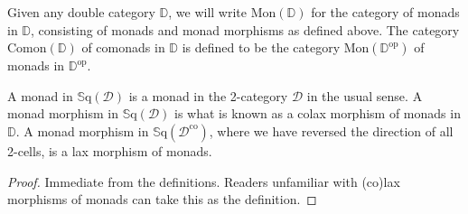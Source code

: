 \begin{definition}
	Given any double category $\mathbb{D}$, we will write $\mathrm{Mon}(\mathbb{D})$ for the category of monads in $\mathbb{D}$, consisting of monads and monad morphisms as defined above. The category $\mathrm{Comon}(\mathbb{D})$ of comonads in $\mathbb{D}$ is defined to be the category $\mathrm{Mon}(\mathbb{D}^{\text{op}})$ of monads in $\mathbb{D}^{\text{op}}$.
\end{definition}

\begin{proposition}
	A monad in $\mathbb{S}\mathrm{q}(\mathcal{D})$ is a monad in the 2-category $\mathcal{D}$ in the usual sense. A monad morphism in $\mathbb{S}\mathrm{q}(\mathcal{D})$ is what is known as a colax morphism of monads in $\mathbb{D}$. A monad morphism in $\mathbb{S}\mathrm{q}(\mathcal{D}^{\text{co}})$, where we have reversed the direction of all 2-cells, is a lax morphism of monads.
\end{proposition}
\begin{proof}
	Immediate from the definitions. Readers unfamiliar with (co)lax morphisms of monads can take this as the definition.
\end{proof}


